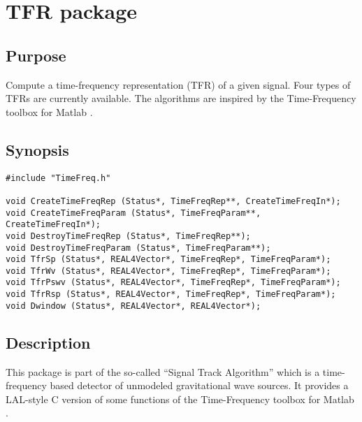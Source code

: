 \documentclass{article}
\begin{document}
\section{TFR package}

\subsection{Purpose}
Compute a time-frequency representation (TFR) of a given signal. Four
types of TFRs are currently available. The algorithms are inspired by
the Time-Frequency toolbox for Matlab \cite{tftb}.

\subsection{Synopsis}


\begin{verbatim}
#include "TimeFreq.h"

void CreateTimeFreqRep (Status*, TimeFreqRep**, CreateTimeFreqIn*);
void CreateTimeFreqParam (Status*, TimeFreqParam**, CreateTimeFreqIn*);
void DestroyTimeFreqRep (Status*, TimeFreqRep**);
void DestroyTimeFreqParam (Status*, TimeFreqParam**);
void TfrSp (Status*, REAL4Vector*, TimeFreqRep*, TimeFreqParam*);
void TfrWv (Status*, REAL4Vector*, TimeFreqRep*, TimeFreqParam*);
void TfrPswv (Status*, REAL4Vector*, TimeFreqRep*, TimeFreqParam*);
void TfrRsp (Status*, REAL4Vector*, TimeFreqRep*, TimeFreqParam*);
void Dwindow (Status*, REAL4Vector*, REAL4Vector*);
\end{verbatim}

\subsection{Description}
This package is part of the so-called ``Signal Track Algorithm'' which
is a time-frequency based detector of unmodeled gravitational wave
sources. It provides a LAL-style C version of some functions of the
Time-Frequency toolbox for Matlab \cite{tftb}. 
\end{document}
